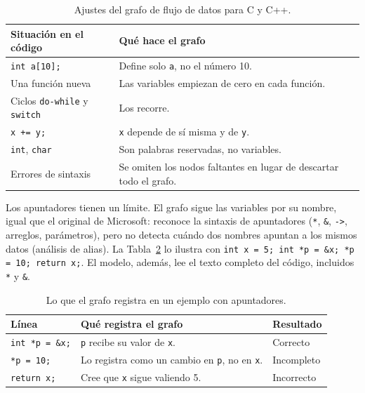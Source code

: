 \begin{table}[H]
    \centering
    \caption{Ajustes del grafo de flujo de datos para C y C++.}
    \label{tab:ajustes_c_cpp}
    \renewcommand{\arraystretch}{1.2}
    \small
    \begin{tabularx}{\textwidth}{|>{\raggedright\arraybackslash}X|>{\raggedright\arraybackslash}X|}
        \hline
        \textbf{Situación en el código} & \textbf{Qué hace el grafo} \\ \hline
        \texttt{int a[10];} & Define solo \texttt{a}, no el número 10. \\ \hline
        Una función nueva & Las variables empiezan de cero en cada función. \\ \hline
        Ciclos \texttt{do-while} y \texttt{switch} & Los recorre. \\ \hline
        \texttt{x += y;} & \texttt{x} depende de sí misma y de \texttt{y}. \\ \hline
        \texttt{int}, \texttt{char} & Son palabras reservadas, no variables. \\ \hline
        Errores de sintaxis & Se omiten los nodos faltantes en lugar de descartar todo el grafo. \\ \hline
    \end{tabularx}
\end{table}

Los apuntadores tienen un límite. El grafo sigue las variables por su nombre, igual que el original de Microsoft: reconoce la sintaxis de apuntadores (\texttt{*}, \texttt{\&}, \texttt{->}, arreglos, parámetros), pero no detecta cuándo dos nombres apuntan a los mismos datos (análisis de alias). La Tabla~\ref{tab:apuntadores} lo ilustra con \texttt{int x = 5; int *p = \&x; *p = 10; return x;}. El modelo, además, lee el texto completo del código, incluidos \texttt{*} y \texttt{\&}.

\begin{table}[H]
    \centering
    \caption{Lo que el grafo registra en un ejemplo con apuntadores.}
    \label{tab:apuntadores}
    \renewcommand{\arraystretch}{1.2}
    \small
    \begin{tabularx}{\textwidth}{|l|X|l|}
        \hline
        \textbf{Línea} & \textbf{Qué registra el grafo} & \textbf{Resultado} \\ \hline
        \texttt{int *p = \&x;} & \texttt{p} recibe su valor de \texttt{x}. & Correcto \\ \hline
        \texttt{*p = 10;} & Lo registra como un cambio en \texttt{p}, no en \texttt{x}. & Incompleto \\ \hline
        \texttt{return x;} & Cree que \texttt{x} sigue valiendo 5. & Incorrecto \\ \hline
    \end{tabularx}
\end{table}

